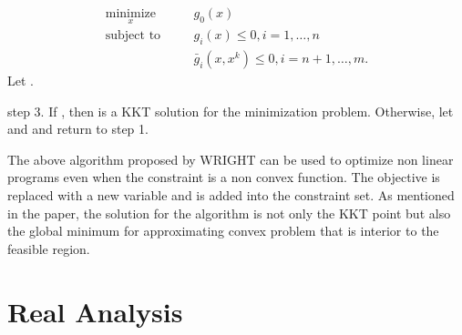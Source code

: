 \begin{eqnarray}
\underset{x}{\text{minimize}} \quad && g_0(x) \\
\text{subject to} \quad && g_i(x) \leq 0, i = 1,\dotsc,n\\
&& \bar{g}_i(x,x^k) \leq 0, i = n + 1,\dotsc,m.
\end{eqnarray} 
Let .\\
\par
step 3. If , then  is a \ac{KKT} solution for the minimization problem. Otherwise, let  and  and return to step 1.\\
\par
The above algorithm proposed by WRIGHT can be used to optimize non linear programs even when the constraint is a non convex function. The objective is replaced with a new variable and is added into the constraint set. As mentioned in the paper, the solution for the algorithm is not only the \ac{KKT} point but also the global minimum for approximating convex problem that is interior to the feasible region.

\section{Real Analysis}




